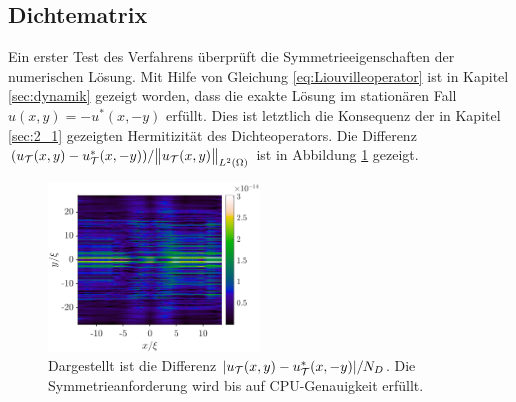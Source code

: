 \subsection{Dichtematrix}
Ein erster Test des Verfahrens überprüft die Symmetrieeigenschaften der numerischen Lösung. Mit Hilfe von Gleichung \eqref{eq:Liouvilleoperator} ist in Kapitel \ref{sec:dynamik} gezeigt worden, dass die exakte Lösung im stationären Fall $u(x,y) = -u^*(x,-y)$ erfüllt. Dies ist letztlich die Konsequenz der in Kapitel \ref{sec:2_1} gezeigten Hermitizität des Dichteoperators. Die Differenz $(u_{\mathcal{T}}(x,y)-u_{\mathcal{T}}^*(x,-y))/\norm{u_{\mathcal{T}}(x,y)}_{L^2(\Omega)}$ ist in Abbildung \ref{fig:parity} gezeigt.
\begin{figure}
  \centering
  \includegraphics[width=0.5\textwidth]{plots/parity_abs.eps}
  \caption{Dargestellt ist die Differenz $|u_{\mathcal{T}}(x,y)-u_{\mathcal{T}}^*(x,-y)|/N_D$. Die Symmetrieanforderung  wird bis auf CPU-Genauigkeit erfüllt.}
  \label{fig:parity}
\end{figure}

